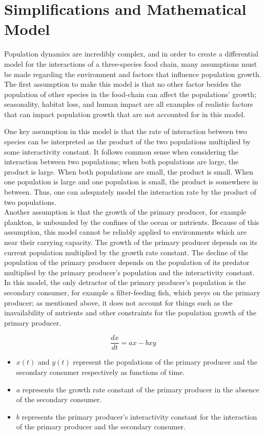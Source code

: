 \documentclass[11pt,oneside]{article}
\begin{document}
	
	\section{Simplifications and Mathematical Model}
	
	Population dynamics are incredibly complex, and in order to create a differential model for the interactions of a three-species food chain, many assumptions must be made regarding the environment and factors that influence population growth. The first assumption to make this model is that no other factor besides the population of other species in the food-chain can affect the populations' growth; seasonality, habitat loss, and human impact are all examples of realistic factors that can impact population growth that are not accounted for in this model.
	
	One key assumption in this model is that the rate of interaction between two species can be interpreted as the product of the two populations multiplied by some interactivity constant. It follows common sense when considering the interaction between two populations; when both populations are large, the product is large. When both populations are small, the product is small. When one population is large and one population is small, the product is somewhere in between. Thus, one can adequately model the interaction rate by the product of two populations.\\
	
	Another assumption is that the growth of the primary producer, for example plankton, is unbounded by the confines of the ocean or nutrients. Because of this assumption, this model cannot be reliably applied to environments which are near their carrying capacity. The growth of the primary producer depends on its current population multiplied by the growth rate constant. The decline of the population of the primary producer depends on the population of its predator multiplied by the primary producer's population and the interactivity constant. In this model, the only detractor of the primary producer's population is the secondary consumer, for example a filter-feeding fish, which preys on the primary producer; as mentioned above, it does not account for things such as the inavailability of nutrients and other constraints for the population growth of the primary producer.
	
	\begin{equation}
	\frac{dx}{dt} = ax - bxy
	\end{equation}
	\begin{itemize}
		\item $x(t)$ and $y(t)$ represent the populations of the primary producer and the secondary consumer respectively as functions of time.
		\item $a$ represents the growth rate constant of the primary producer in the absence of the secondary consumer.
		\item $b$ represents the primary producer's interactivity constant for the interaction of the primary producer and the secondary consumer.
	\end{itemize}
	
\end{document}
